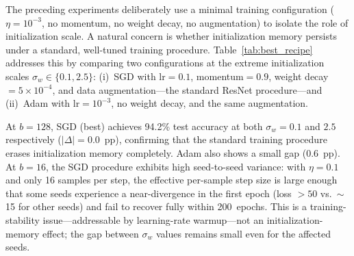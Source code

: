 \documentclass{article}
\begin{document}
The preceding experiments deliberately use a minimal training
configuration ($\eta{=}10^{-3}$, no momentum, no weight decay, no
augmentation) to isolate the role of initialization scale.  A natural
concern is whether initialization memory persists under a standard,
well-tuned training procedure.  Table~\ref{tab:best_recipe} addresses
this by comparing two configurations at the extreme initialization
scales $\sigma_w \in \{0.1, 2.5\}$: (i)~SGD with lr${=}0.1$,
momentum${=}0.9$, weight decay $=5\times 10^{-4}$, and data
augmentation---the standard ResNet procedure---and (ii)~Adam with
lr${=}10^{-3}$, no weight decay, and the same augmentation.

At $b{=}128$, SGD (best) achieves 94.2\% test accuracy at both
$\sigma_w{=}0.1$ and $2.5$ respectively ($|\Delta|{=}0.0$~pp),
confirming that the standard training procedure erases initialization memory
completely.  Adam also shows a small gap (0.6~pp).  At $b{=}16$, the
SGD procedure exhibits high seed-to-seed variance: with $\eta{=}0.1$ and
only 16 samples per step, the effective per-sample step size is large
enough that some seeds experience a near-divergence in the first epoch
(loss $>50$ vs.\ $\sim$15 for other seeds) and fail to recover fully
within 200~epochs.  This is a training-stability issue---addressable
by learning-rate warmup---not an initialization-memory effect; the gap
between $\sigma_w$ values remains small even for the affected seeds.
\end{document}
